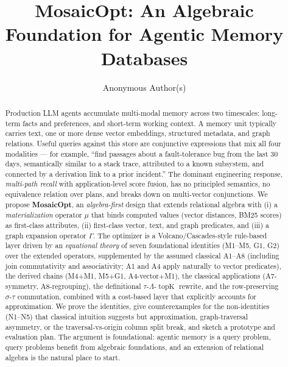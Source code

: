 \documentclass[sigconf,nonacm,review]{acmart}
\title{MosaicOpt: An Algebraic Foundation for Agentic Memory Databases}
\author{Anonymous Author(s)}
\affiliation{
  \institution{Anonymous Institution}
  \city{Anonymous City}
  \state{Anonymous State}
  \country{Anonymous Country}}
\theoremstyle{plain}
\theoremstyle{definition}
\newcommand{\topK}{\operatorname{topK}}
\theoremstyle{remark}
\begin{document}
\begin{abstract}
\noindent
Production LLM agents accumulate multi-modal memory across two timescales:
long-term facts and preferences, and short-term working context. A memory
unit typically carries text, one or more dense vector embeddings,
structured metadata, and graph relations. Useful queries against this
store are conjunctive expressions that mix all four modalities --- for
example, ``find passages about a fault-tolerance bug from the last 30
days, semantically similar to a stack trace, attributed to a known
subsystem, and connected by a derivation link to a prior incident.'' The
dominant engineering response, \emph{multi-path recall} with
application-level score fusion, has no principled semantics, no
equivalence relation over plans, and breaks down on multi-vector
conjunctions. We propose \textbf{MosaicOpt}, an \emph{algebra-first}
design that extends relational algebra with (i) a \emph{materialization}
operator $\mu$ that binds computed values (vector distances, BM25
scores) as first-class attributes, (ii) first-class vector, text, and
graph predicates, and (iii) a graph expansion operator $\Gamma$. The
optimizer is a Volcano/Cascades-style rule-based layer driven by an
\emph{equational theory} of seven foundational identities (M1--M5,
G1, G2) over the extended operators, supplemented by the assumed
classical A1--A8 (including join commutativity and associativity; A1
and A4 apply naturally to vector predicates), the derived chains
(M4+M1, M5+G1, A4-vector+M1), the classical applications
(A7-symmetry, A8-regrouping), the definitional
$\tau$-$\Lambda$-$\topK$ rewrite, and the row-preserving
$\sigma$-$\tau$ commutation, combined with a cost-based layer that
explicitly accounts for approximation. We prove the identities, give counterexamples for the
non-identities (N1--N5) that classical intuition suggests but
approximation, graph-traversal asymmetry, or the
traversal-vs-origin column split break, and sketch a prototype and
evaluation plan. The argument is foundational: agentic memory is a
query problem, query
problems benefit from algebraic foundations, and an extension of
relational algebra is the natural place to start.
\end{abstract}

\maketitle

\end{document}
